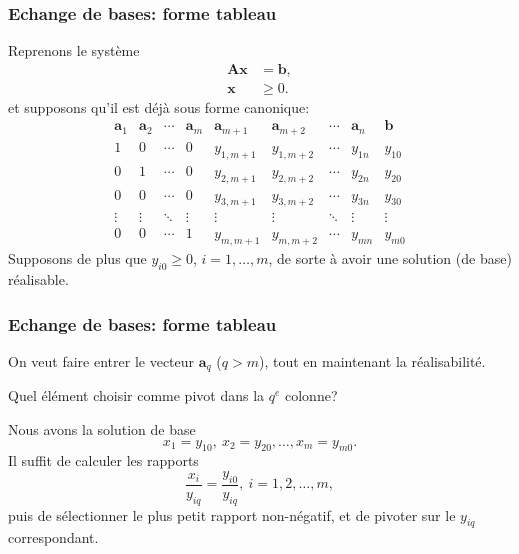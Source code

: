 \documentclass[t,usepdftitle=false]{beamer}
\def\ba{\boldsymbol{a}}
\def\bb{\boldsymbol{b}}
\def\bx{\boldsymbol{x}}
\def\bA{\boldsymbol{A}}
\begin{document}
\begin{frame}
\frametitle{Echange de bases: forme tableau}

Reprenons le système
\begin{align*}
\bA \bx &= \bb, \\
\bx &\geq 0.
\end{align*}
et supposons qu'il est déjà sous forme canonique:
\[
\begin{matrix}
\ba_1 & \ba_2 & \cdots & \ba_m & \ba_{m+1} &
\ba_{m+2} & \cdots & \ba_n & \bb \\
1 & 0 & \cdots & 0 & y_{1,m+1} & y_{1,m+2} & \cdots & y_{1n} & y_{10} \\
0 & 1 & \cdots & 0 & y_{2,m+1} & y_{2,m+2} & \cdots & y_{2n} & y_{20} \\
0 & 0 & \cdots & 0 & y_{3,m+1} & y_{3,m+2} & \cdots & y_{3n} & y_{30} \\
\vdots & \vdots & \ddots & \vdots & \vdots & \vdots & \ddots & \vdots & \vdots \\
0 & 0 & \cdots & 1 & y_{m,m+1} & y_{m,m+2} & \cdots & y_{mn} & y_{m0}
\end{matrix}
\]
Supposons de plus que $y_{i0} \geq 0$, $i = 1,\ldots, m$, de sorte à avoir une solution (de base) réalisable.

\end{frame}

\begin{frame}
\frametitle{Echange de bases: forme tableau}

On veut faire entrer le vecteur $\ba_q$ ($q > m$), tout en maintenant la réalisabilité.

\mbox{}

Quel élément choisir comme pivot dans la $q^e$ colonne?

\mbox{}

Nous avons la solution de base
\[
x_1 = y_{10},\ x_2 = y_{20},\ldots, x_m = y_{m0}. 
\]
Il suffit de calculer les rapports
\[
\frac{x_i}{y_{iq}} = \frac{y_{i0}}{y_{iq}},\ i = 1,2,\ldots,m,
\]
puis de sélectionner le plus petit rapport non-négatif, et de pivoter sur le $y_{iq}$ correspondant.

\end{frame}
\end{document}
